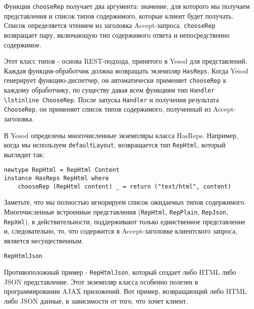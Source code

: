 Функция \lstinline `chooseRep` получает два аргумента: значение, для которого мы получаем представления и список типов содержимого, которые клиент будет получать. Список определяется чтением из заголовка Accept-запроса. \lstinline `chooseRep` возвращает пару, включающую тип содержимого ответа и непосредственно содержимое.

Этот класс типов - основа REST-подхода, принятого в Yesod для представлений. Каждая функция-обработчик должна возвращать экземпляр \lstinline `HasReps`. Когда Yesod генерирует функцию-диспетчер, он автоматически применяет \lstinline 'chooseRep' к каждому обработчику, по существу давая всем функциям тип \lstinline 'Handler \lstinline ChooseRep'. После  запуска \lstinline 'Handler' и получения результата \lstinline 'ChooseRep',  он применяет список типов содержимого, полученный из Accept-заголовка.

В Yesod определены многочисленные экземпляры класса HasReps. Например, когда мы используем \lstinline `defaultLayout`, возвращается тип \lstinline 'RepHtml', который выглядит так:

\begin{lstlisting}
newtype RepHtml = RepHtml Content
instance HasReps RepHtml where
    chooseRep (RepHtml content) _ = return ("text/html", content)
\end{lstlisting}

Заметьте, что мы полностью игнорируем список ожидаемых типов содержимого. Многочисленные встроенные представления (\lstinline 'RepHtml', \lstinline 'RepPlain', \lstinline 'RepJson', \lstinline 'RepXml'), в действительности, поддерживают только единственное представление и, следовательно, то, что содержится в Accept-заголовке клиентского запроса, является несущественным.

\lstinline 'RepHtmlJson'

Противоположный пример - \lstinline 'RepHtmlJson', который создает либо HTML либо JSON представление. Этот экземпляр класса особенно полезен в программировании AJAX приложений. Вот пример, возвращающий либо HTML либо JSON данные, в зависимости от того, что хочет клиент. 

